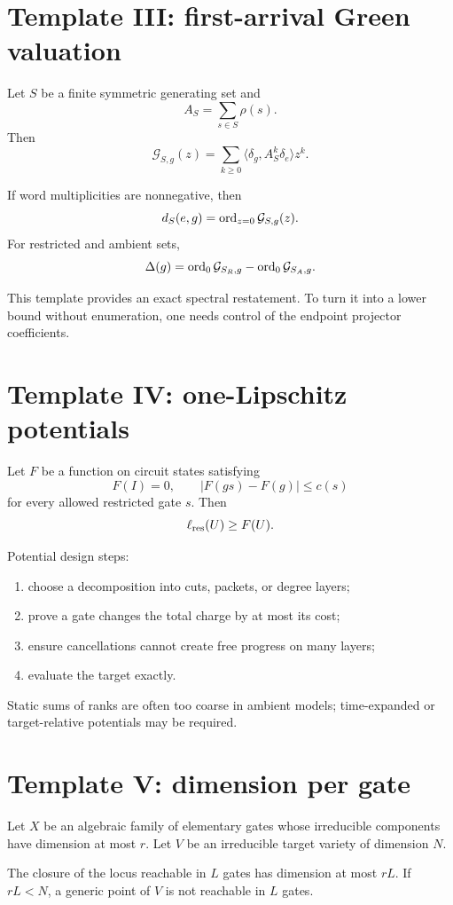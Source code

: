 \section{Template III: first-arrival Green valuation}
Let $S$ be a finite symmetric generating set and
\[
A_S=\sum_{s\in S}\rho(s).
\]
Then
\[
\mathcal G_{S,g}(z)
=\sum_{k\ge0}\langle\delta_g,A_S^k\delta_e\rangle z^k.
\]

\begin{theorem}
If word multiplicities are nonnegative, then
\[
d_S(e,g)=\operatorname{ord}_{z=0}\mathcal G_{S,g}(z).
\]
For restricted and ambient sets,
\[
\Delta(g)=\operatorname{ord}_0\mathcal G_{S_R,g}-\operatorname{ord}_0\mathcal G_{S_A,g}.
\]
\end{theorem}

This template provides an exact spectral restatement.  To turn it into a lower bound without enumeration, one needs control of the endpoint projector coefficients.

\section{Template IV: one-Lipschitz potentials}
Let $F$ be a function on circuit states satisfying
\[
F(I)=0,
\qquad
|F(gs)-F(g)|\le c(s)
\]
for every allowed restricted gate $s$.  Then
\[
\ell_{\mathrm{res}}(U)\ge F(U).
\]

Potential design steps:
\begin{enumerate}
\item choose a decomposition into cuts, packets, or degree layers;
\item prove a gate changes the total charge by at most its cost;
\item ensure cancellations cannot create free progress on many layers;
\item evaluate the target exactly.
\end{enumerate}
Static sums of ranks are often too coarse in ambient models; time-expanded or target-relative potentials may be required.

\section{Template V: dimension per gate}
Let $X$ be an algebraic family of elementary gates whose irreducible components have dimension at most $r$.  Let $V$ be an irreducible target variety of dimension $N$.

\begin{theorem}
The closure of the locus reachable in $L$ gates has dimension at most $rL$.  If $rL<N$, a generic point of $V$ is not reachable in $L$ gates.
\end{theorem}

